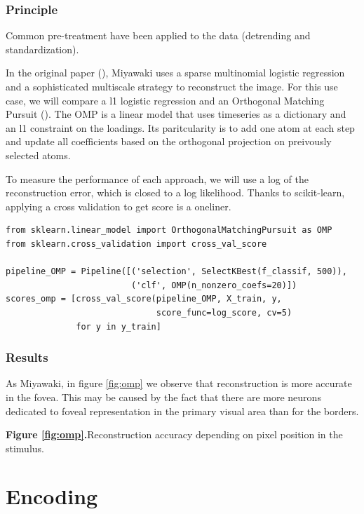 \documentclass{frontiersSCNS} %
\begin{document}
\subsubsection{Principle} %

Common pre-treatment have been applied to the data (detrending and
standardization).

In the original paper (\cite{miyawaki2008}), Miyawaki uses a sparse multinomial
logistic regression and a sophisticated multiscale strategy to reconstruct the image.
For this use case, we will compare a l1 logistic regression and an Orthogonal
Matching Pursuit (\cite{mallat1993}). The OMP is a linear model that uses
timeseries as a dictionary and an l1 constraint on the loadings. Its
paritcularity is to add one atom at each step and update all coefficients
based on the orthogonal projection on preivously selected atoms.

To measure the performance of each approach, we will use a log of the
reconstruction error, which is closed to a log likelihood. Thanks to
scikit-learn, applying a cross validation to get score is a oneliner.

\begin{lstlisting}
from sklearn.linear_model import OrthogonalMatchingPursuit as OMP
from sklearn.cross_validation import cross_val_score

pipeline_OMP = Pipeline([('selection', SelectKBest(f_classif, 500)),
                         ('clf', OMP(n_nonzero_coefs=20)])
scores_omp = [cross_val_score(pipeline_OMP, X_train, y,
                              score_func=log_score, cv=5)
              for y in y_train]
\end{lstlisting}

\subsubsection{Results}

As Miyawaki, in figure \ref{fig:omp} we observe that reconstruction is more accurate in the fovea. This
may be caused by the fact that there are more neurons dedicated to foveal
representation in the primary visual area than for the borders.

\textbf{Figure \ref{fig:omp}.}{Reconstruction accuracy depending on pixel
position in the stimulus.}\label{fig:02}

\section{Encoding}
\end{document}
